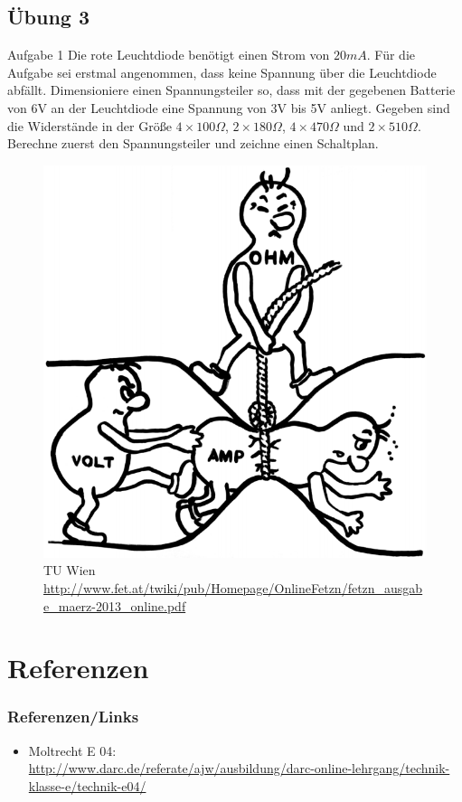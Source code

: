 \subsection*{Übung 3}
\begin{frame}
  \begin{alertblock}{Aufgabe 1}
    Die rote Leuchtdiode benötigt einen Strom von $20mA$. Für die Aufgabe sei erstmal angenommen, dass keine Spannung über die Leuchtdiode abfällt. Dimensioniere einen Spannungsteiler so, dass mit der gegebenen Batterie von 6V an der Leuchtdiode eine Spannung von 3V bis 5V anliegt. Gegeben sind die Widerstände in der Größe $4\times100\Omega$, $2\times180\Omega$, $4\times470\Omega$ und $2\times510\Omega$. Berechne zuerst den Spannungsteiler und zeichne einen Schaltplan.
  \end{alertblock}
\end{frame}

\begin{frame}

	\begin{center}
	\begin{figure}
        \includegraphics[width=.5\textwidth]{e04/URI.png}
        \caption{\tiny TU Wien \url{http://www.fet.at/twiki/pub/Homepage/OnlineFetzn/fetzn_ausgabe_maerz-2013_online.pdf}}
	\end{figure}
    \end{center}
    
\end{frame}

\section*{Referenzen}

\begin{frame}
    \frametitle{Referenzen/Links}
    
    \footnotesize
    \begin{itemize}
        \item Moltrecht E 04: \\
              \url{http://www.darc.de/referate/ajw/ausbildung/darc-online-lehrgang/technik-klasse-e/technik-e04/}
    \end{itemize}

\end{frame}


